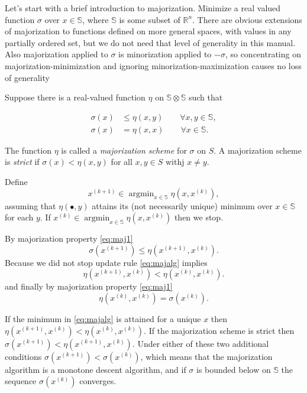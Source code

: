\documentclass[
  12pt,
]{article}
\begin{document}
Let's start with a brief introduction to majorization. Minimize a real
valued function \(\sigma\) over \(x\in\mathbb{S}\), where \(\mathbb{S}\) is
some subset of \(\mathbb{R}^n\). There are obvious extensions of
majorization to functions defined on more general spaces, with values in
any partially ordered set, but we do not need that level of generality
in this manual. Also majorization applied to \(\sigma\) is minorization
applied to \(-\sigma\), so concentrating on majorization-minimization and
ignoring minorization-maximization causes no loss of generality

Suppose there is a real-valued function \(\eta\) on
\(\mathbb{S}\otimes\mathbb{S}\) such that

\begin{align}
\sigma(x)&\leq\eta(x,y)\qquad\forall x,y\in\mathbb{S},\label{eq:maj1}\\
\sigma(x)&=\eta(x,x)\qquad\forall x\in\mathbb{S}.\label{eq:maj2}
\end{align}

The function \(\eta\) is called a \emph{majorization scheme} for \(\sigma\) on
\(S\). A majorization scheme is \emph{strict} if \(\sigma(x)<\eta(x,y)\) for all
\(x,y\in S\) withj \(x\not=y\).

Define \begin{equation}
x^{(k+1)}\in\mathop{\text{argmin}}_{x\in\mathbb{S}}\eta(x,x^{(k)}),
\label{eq:majalg}
\end{equation} assuming that \(\eta(\bullet,y)\) attains its (not
necessarily unique) minimum over \(x\in\mathbb{S}\) for each \(y\). If
\(x^{(k)}\in\mathop{\text{argmin}}_{x\in\mathbb{S}}\eta(x,x^{(k)})\)
then we stop.

By majorization property \eqref{eq:maj1}
\begin{equation}
\sigma(x^{(k+1)})\leq\eta(x^{(k+1)},x^{(k)}).
\end{equation}
Because we did not stop update rule \eqref{eq:majalg} implies
\begin{equation}
\eta(x^{(k+1)},x^{(k)})<\eta(x^{(k)},x^{(k)}).
\end{equation}
and finally by majorization property \eqref{eq:maj1}
\begin{equation}
\eta(x^{(k)},x^{(k)})=\sigma(x^{(k)}).
\end{equation}

If the minimum in \eqref{eq:majalg} is attained for a unique \(x\) then
\(\eta(x^{(k+1)},x^{(k)})<\eta(x^{(k)},x^{(k)})\). If the majorization
scheme is strict then \(\sigma(x^{(k+1)})<\eta(x^{(k+1)},x^{(k)})\). Under
either of these two additional conditions
\(\sigma(x^{(k+1)})<\sigma(x^{(k)})\), which means that the majorization
algorithm is a monotone descent algorithm, and if \(\sigma\) is bounded
below on \(\mathbb{S}\) the sequence \(\sigma(x^{(k)})\) converges.
\end{document}
